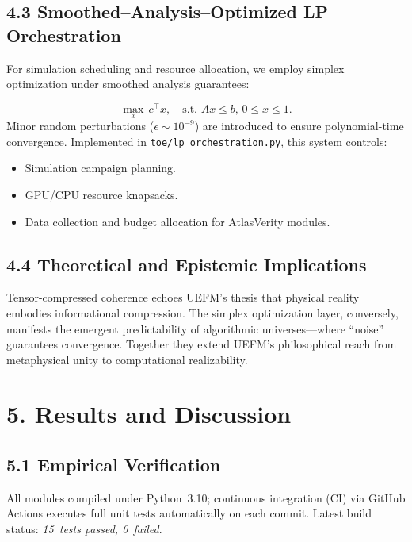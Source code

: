 \documentclass[11pt]{article}
\begin{document}
\subsection*{4.3 Smoothed–Analysis–Optimized LP Orchestration}

For simulation scheduling and resource allocation, we employ simplex optimization under smoothed analysis guarantees:

\[
\max_x \, c^\top x, \quad \text{s.t. } A x \le b, \, 0 \le x \le 1.
\]
Minor random perturbations ($\epsilon \sim 10^{-9}$) are introduced to ensure polynomial-time convergence.
Implemented in \texttt{toe/lp\_orchestration.py}, this system controls:
\begin{itemize}
    \item Simulation campaign planning.
    \item GPU/CPU resource knapsacks.
    \item Data collection and budget allocation for AtlasVerity modules.
\end{itemize}

\subsection*{4.4 Theoretical and Epistemic Implications}

Tensor-compressed coherence echoes UEFM’s thesis that physical reality embodies informational compression. The simplex optimization layer, conversely, manifests the emergent predictability of algorithmic universes—where “noise” guarantees convergence. Together they extend UEFM’s philosophical reach from metaphysical unity to computational realizability.

\section{5. Results and Discussion}

\subsection*{5.1 Empirical Verification}

All modules compiled under Python~3.10; continuous integration (CI) via GitHub Actions executes full unit tests automatically on each commit. Latest build status: \emph{15~tests passed, 0~failed}.
\end{document}
